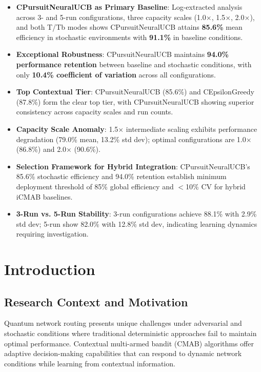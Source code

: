 \documentclass[12pt,a4paper]{article}
\newcommand{\primarytext}[1]{\textcolor{primaryblue}{\textbf{#1}}}
\newcommand{\secondarytext}[1]{\textcolor{secondaryblue}{\textbf{#1}}}
\newcommand{\success}[1]{\textcolor{accentgreen}{\textbf{#1}}}
\newcommand{\warning}[1]{\textcolor{warningred}{\textbf{#1}}}
\begin{document}
\begin{tcolorbox}[colback=highlightgray,colframe=primaryblue,title=\textbf{Executive Summary - Key Findings (Log-Extracted)}]
\begin{itemize}
    \item \primarytext{CPursuitNeuralUCB as Primary Baseline}: Log-extracted analysis across 3- and 5-run configurations, three capacity scales (1.0$\times$, 1.5$\times$, 2.0$\times$), and both T/Tb modes shows CPursuitNeuralUCB attains \success{85.6\%} mean efficiency in stochastic environments with \success{91.1\%} in baseline conditions.
    \item \success{Exceptional Robustness}: CPursuitNeuralUCB maintains \success{94.0\% performance retention} between baseline and stochastic conditions, with only \success{10.4\% coefficient of variation} across all configurations.
    \item \secondarytext{Top Contextual Tier}: CPursuitNeuralUCB (85.6\%) and CEpsilonGreedy (87.8\%) form the clear top tier, with CPursuitNeuralUCB showing superior consistency across capacity scales and run counts.
    \item \warning{Capacity Scale Anomaly}: 1.5$\times$ intermediate scaling exhibits performance degradation (79.0\% mean, 13.2\% std dev); optimal configurations are 1.0$\times$ (86.8\%) and 2.0$\times$ (90.6\%).
    \item \success{Selection Framework for Hybrid Integration}: CPursuitNeuralUCB's 85.6\% stochastic efficiency and 94.0\% retention establish minimum deployment threshold of 85\% global efficiency and $<$10\% CV for hybrid iCMAB baselines.
    \item \primarytext{3-Run vs. 5-Run Stability}: 3-run configurations achieve 88.1\% with 2.9\% std dev; 5-run show 82.0\% with 12.8\% std dev, indicating learning dynamics requiring investigation.
\end{itemize}
\end{tcolorbox}

\newpage
\section{Introduction}

\subsection{Research Context and Motivation}

Quantum network routing presents unique challenges under adversarial and stochastic conditions where traditional deterministic approaches fail to maintain optimal performance. Contextual multi-armed bandit (CMAB) algorithms offer adaptive decision-making capabilities that can respond to dynamic network conditions while learning from contextual information.
\end{document}
